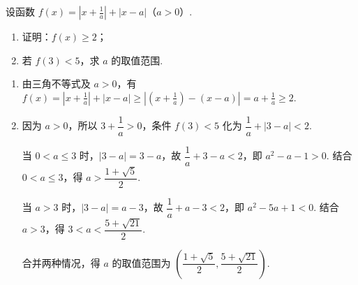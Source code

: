 \begin{problem}
设函数 \(f(x)=\left|x+\frac{1}{a}\right|+\left|x-a\right|\)（\(a>0\)）.
\begin{enumerate}
\item 证明：\(f(x)\geqslant 2\)；
\item 若 \(f(3)<5\)，求 \(a\) 的取值范围.
\end{enumerate}
\end{problem}

\begin{solution}
\begin{enumerate}
\item 由三角不等式及 \(a>0\)，有
\(f(x)=\left|x+\frac{1}{a}\right|+|x-a|\geqslant\left|\left(x+\frac{1}{a}\right)-(x-a)\right|=a+\frac{1}{a}\geqslant2\).

\item 因为 \(a>0\)，所以 \(3+\dfrac{1}{a}>0\)，条件 \(f(3)<5\) 化为
\(\dfrac{1}{a}+|3-a|<2\).

当 \(0<a\leqslant3\) 时，\(|3-a|=3-a\)，故
\(\dfrac{1}{a}+3-a<2\)，即 \(a^2-a-1>0\). 结合 \(0<a\leqslant3\)，得 \(a>\dfrac{1+\sqrt{5}}{2}\).

当 \(a>3\) 时，\(|3-a|=a-3\)，故
\(\dfrac{1}{a}+a-3<2\)，即 \(a^2-5a+1<0\). 结合 \(a>3\)，得 \(3<a<\dfrac{5+\sqrt{21}}{2}\).

合并两种情况，得 \(a\) 的取值范围为
\(\left(\dfrac{1+\sqrt{5}}{2},\dfrac{5+\sqrt{21}}{2}\right)\).
\end{enumerate}
\end{solution}
